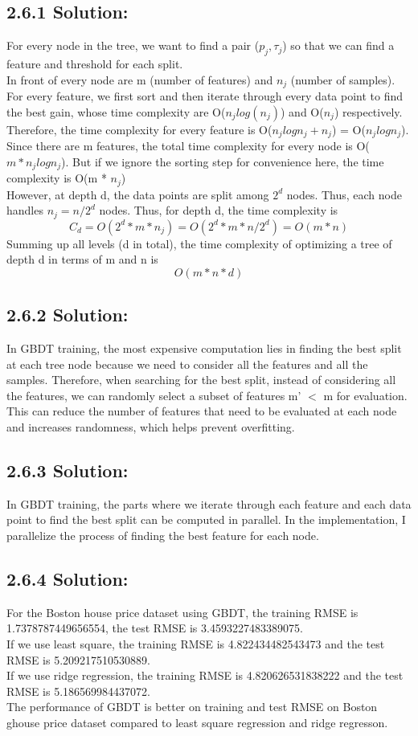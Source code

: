 \documentclass{article}
\begin{document}
\subsection*{2.6.1 Solution:}
For every node in the tree, we want to find a pair ($p_j, \tau_j$) so that we can find a feature and threshold for each split. \\
In front of every node are m (number of features) and $n_j$ (number of samples). For every feature, we first sort and then iterate through every data point to find the best gain, whose time complexity are O($n_j log(n_j)$) and O($n_j$) respectively.
Therefore, the time complexity for every feature is O($n_j log n_j + n_j$) = O($n_j log n_j$). Since there are m features, the total time complexity for every node is O($m * n_j log n_j$). But if we ignore the sorting step for convenience here, the time complexity is O(m * $n_j$)\\
However, at depth d, the data points are split among $2^d$ nodes. Thus, each node handles $n_j = n / 2^d$ nodes. Thus, for depth d, the time complexity is
\[C_d = O(2^d * m * n_j) = O(2^d * m * n / 2^d) = O(m * n)\]
Summing up all levels (d in total), the time complexity of optimizing a tree of depth d in terms of m and n is 
\[O(m * n * d)\]

\subsection*{2.6.2 Solution:}
In GBDT training, the most expensive computation lies in  finding the best split at each tree node because we need
to consider all the features and all the samples. Therefore, when searching for the best split, instead of considering all the features, we can 
randomly select a subset of features m' $<$ m for evaluation. This can reduce the number of features that need to be evaluated at each node and increases randomness, which helps prevent overfitting.

\subsection*{2.6.3 Solution:}
In GBDT training, the parts where we iterate through each feature and each data point to find the best split can be computed in parallel.
In the implementation, I parallelize the process of finding the best feature for each node.

\subsection*{2.6.4 Solution:}
For the Boston house price dataset using GBDT, the training RMSE is 1.7378787449656554, the test RMSE is 3.4593227483389075.\\
If we use least square, the training RMSE is 4.822434482543473 and the test RMSE is 5.209217510530889.\\
If we use ridge regression, the training RMSE is 4.820626531838222 and the test RMSE is 5.186569984437072.\\
The performance of GBDT is better on training and test RMSE on Boston ghouse price dataset compared to least square regression and ridge regresson.
\end{document}
